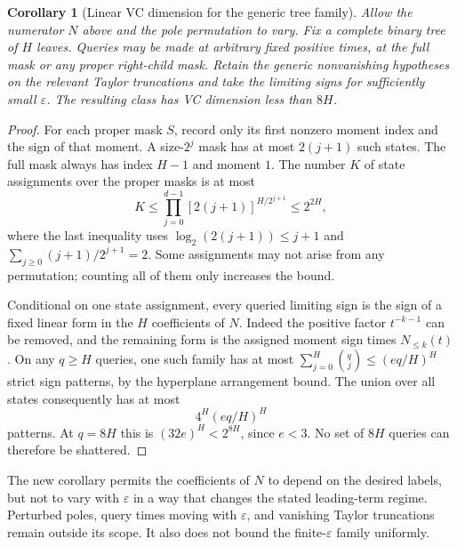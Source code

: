 \documentclass[11pt]{article}
\newtheorem{corollary}{Corollary}
\begin{document}
\begin{corollary}[Linear VC dimension for the generic tree family]
Allow the numerator $N$ above and the pole permutation to vary. Fix a
complete binary tree of $H$ leaves. Queries may be made at arbitrary
fixed positive times, at the full mask or any proper right-child mask.
Retain the generic nonvanishing hypotheses on the relevant Taylor
truncations and take the limiting signs for sufficiently small
$\varepsilon$. The resulting class has VC dimension less than $8H$.
\end{corollary}
\begin{proof}
For each proper mask $S$, record only its first nonzero moment index
and the sign of that moment. A size-$2^j$ mask has at most $2(j+1)$
such states. The full mask always has index $H-1$ and moment $1$.
The number $K$ of state assignments over the proper masks is at most
\[
 K\leq\prod_{j=0}^{d-1}[2(j+1)]^{H/2^{j+1}}
 \leq 2^{2H},
\]
where the last inequality uses
$\log_2(2(j+1))\leq j+1$ and
$\sum_{j\geq0}(j+1)/2^{j+1}=2$.
Some assignments may not arise from any permutation; counting all
of them only increases the bound.

Conditional on one state assignment, every queried limiting sign is
the sign of a fixed linear form in the $H$ coefficients of $N$.
Indeed the positive factor $t^{-k-1}$ can be removed, and the remaining
form is the assigned moment sign times $N_{\leq k}(t)$.
On any $q\geq H$ queries, one such family has at most
$\sum_{j=0}^{H}\binom qj\leq(eq/H)^H$ strict sign patterns, by the
hyperplane arrangement bound. The union over all states consequently
has at most
\[
 4^H(eq/H)^H
\]
patterns. At $q=8H$ this is $(32e)^H<2^{8H}$, since $e<3$.
No set of $8H$ queries can therefore be shattered.
\end{proof}

The new corollary permits the coefficients of $N$ to depend on the
desired labels, but not to vary with $\varepsilon$ in a way that changes
the stated leading-term regime. Perturbed poles, query times moving
with $\varepsilon$, and vanishing Taylor truncations remain outside its
scope. It also does not bound the finite-$\varepsilon$ family uniformly.
\end{document}
